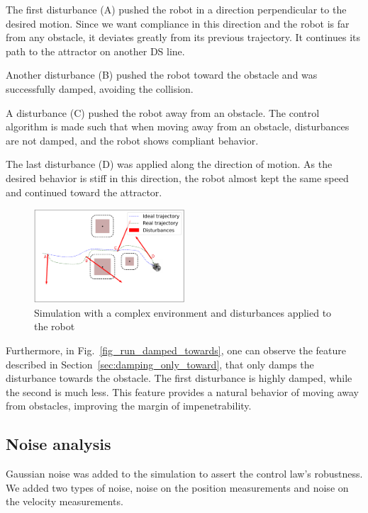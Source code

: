 \documentclass[conference]{IEEEtran}
\begin{document}
The first disturbance (A) pushed the robot in a direction perpendicular to the desired motion. Since we want compliance in this direction and the robot is far from any obstacle, it deviates greatly from its previous trajectory. It continues its path to the attractor on another DS line.

Another disturbance (B) pushed the robot toward the obstacle and was successfully damped, avoiding the collision.

A disturbance (C) pushed the robot away from an obstacle. The control algorithm is made such that when moving away from an obstacle, disturbances are not damped, and the robot shows compliant behavior. 

The last disturbance (D) was applied along the direction of motion. As the desired behavior is stiff in this direction, the robot almost kept the same speed and continued toward the attractor. \\

\begin{figure}
\centerline{\includegraphics[width=0.5\textwidth]{figures/run_with_obs.png}}
\caption{Simulation with a complex environment and disturbances applied to the robot}
\label{fig_run_with_obs}
\end{figure}

Furthermore, in Fig.~\ref{fig_run_damped_towards}, one can observe the feature described in Section~\ref{sec:damping_only_toward}, that only damps the disturbance towards the obstacle.
The first disturbance is highly damped, while the second is much less. This feature provides a natural behavior of moving away from obstacles, improving the margin of impenetrability. 

\subsection{Noise analysis}
Gaussian noise was added to the simulation to assert the control law's robustness. We added two types of noise, noise on the position measurements and noise on the velocity measurements. 
\end{document}
